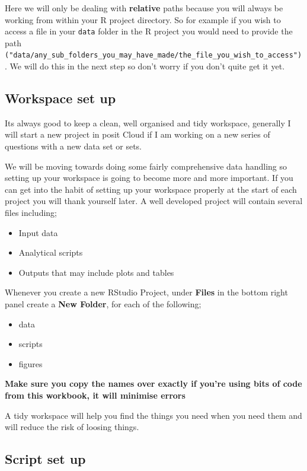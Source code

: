 \documentclass[
]{book}
\providecommand{\tightlist}{%
  \setlength{\itemsep}{0pt}\setlength{\parskip}{0pt}}
\begin{document}
Here we will only be dealing with \textbf{relative} paths because you will always be working from within your R project directory. So for example if you wish to access a file in your \texttt{data} folder in the R project you would need to provide the path \texttt{("data/any\_sub\_folders\_you\_may\_have\_made/the\_file\_you\_wish\_to\_access")}. We will do this in the next step so don't worry if you don't quite get it yet.

\hypertarget{workspace-setup}{%
\subsection{Workspace set up}\label{workspace-setup}}

Its always good to keep a clean, well organised and tidy workspace, generally I will start a new project in posit Cloud if I am working on a new series of questions with a new data set or sets.

We will be moving towards doing some fairly comprehensive data handling so setting up your workspace is going to become more and more important. If you can get into the habit of setting up your workspace properly at the start of each project you will thank yourself later. A well developed project will contain several files including;

\begin{itemize}
\tightlist
\item
  Input data
\item
  Analytical scripts
\item
  Outputs that may include plots and tables
\end{itemize}

Whenever you create a new RStudio Project, under \textbf{Files} in the bottom right panel create a \textbf{New Folder}, for each of the following;

\begin{itemize}
\tightlist
\item
  data
\item
  scripts
\item
  figures
\end{itemize}

\textbf{Make sure you copy the names over exactly if you're using bits of code from this workbook, it will minimise errors}

A tidy workspace will help you find the things you need when you need them and will reduce the risk of loosing things.

\hypertarget{script-setup}{%
\subsection{Script set up}\label{script-setup}}
\end{document}
